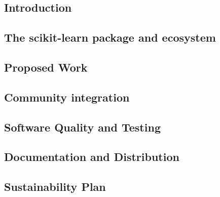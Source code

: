 



\subsection{Introduction}

\subsection{The scikit-learn package and ecosystem}

\subsection{Proposed Work}






\subsection{Community integration}
\subsection{Software Quality and Testing}
\subsection{Documentation and Distribution}
\subsection{Sustainability Plan}

